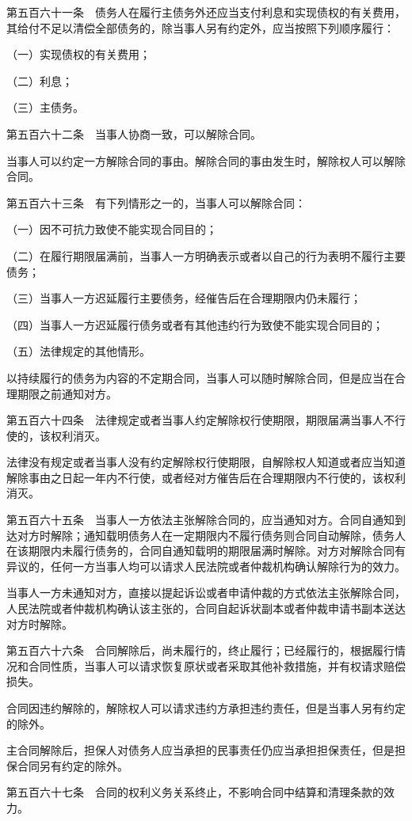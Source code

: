 \documentclass[UTF8,12pt,a4paper]{ctexbook}
\begin{document}
第五百六十一条　债务人在履行主债务外还应当支付利息和实现债权的有关费用，其给付不足以清偿全部债务的，除当事人另有约定外，应当按照下列顺序履行：

（一）实现债权的有关费用；

（二）利息；

（三）主债务。

第五百六十二条　当事人协商一致，可以解除合同。

当事人可以约定一方解除合同的事由。解除合同的事由发生时，解除权人可以解除合同。

第五百六十三条　有下列情形之一的，当事人可以解除合同：

（一）因不可抗力致使不能实现合同目的；

（二）在履行期限届满前，当事人一方明确表示或者以自己的行为表明不履行主要债务；

（三）当事人一方迟延履行主要债务，经催告后在合理期限内仍未履行；

（四）当事人一方迟延履行债务或者有其他违约行为致使不能实现合同目的；

（五）法律规定的其他情形。

以持续履行的债务为内容的不定期合同，当事人可以随时解除合同，但是应当在合理期限之前通知对方。

第五百六十四条　法律规定或者当事人约定解除权行使期限，期限届满当事人不行使的，该权利消灭。

法律没有规定或者当事人没有约定解除权行使期限，自解除权人知道或者应当知道解除事由之日起一年内不行使，或者经对方催告后在合理期限内不行使的，该权利消灭。

第五百六十五条　当事人一方依法主张解除合同的，应当通知对方。合同自通知到达对方时解除；通知载明债务人在一定期限内不履行债务则合同自动解除，债务人在该期限内未履行债务的，合同自通知载明的期限届满时解除。对方对解除合同有异议的，任何一方当事人均可以请求人民法院或者仲裁机构确认解除行为的效力。

当事人一方未通知对方，直接以提起诉讼或者申请仲裁的方式依法主张解除合同，人民法院或者仲裁机构确认该主张的，合同自起诉状副本或者仲裁申请书副本送达对方时解除。

第五百六十六条　合同解除后，尚未履行的，终止履行；已经履行的，根据履行情况和合同性质，当事人可以请求恢复原状或者采取其他补救措施，并有权请求赔偿损失。

合同因违约解除的，解除权人可以请求违约方承担违约责任，但是当事人另有约定的除外。

主合同解除后，担保人对债务人应当承担的民事责任仍应当承担担保责任，但是担保合同另有约定的除外。

第五百六十七条　合同的权利义务关系终止，不影响合同中结算和清理条款的效力。
\end{document}
